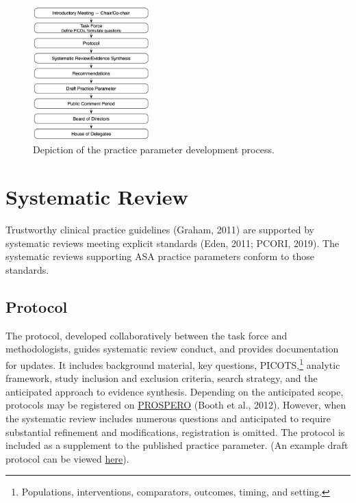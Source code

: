 \documentclass[
  letterpaper,
  DIV=11,
  numbers=noendperiod]{scrreprt}
\begin{document}
\begin{figure}

\caption{\label{fig-process}Depiction of the practice parameter
development process.}

{\centering \includegraphics[width=0.4\textwidth,height=\textheight]{assets/process.png}

}

\end{figure}


\hypertarget{systematic-review}{%
\chapter{Systematic Review}\label{systematic-review}}

Trustworthy clinical practice guidelines (Graham, 2011) are supported by
systematic reviews meeting explicit standards (Eden, 2011; PCORI, 2019).
The systematic reviews supporting ASA practice parameters conform to
those standards.

\hypertarget{protocol}{%
\section{Protocol}\label{protocol}}

The protocol, developed collaboratively between the task force and
methodologists, guides systematic review conduct, and provides
documentation for updates. It includes background material, key
questions, PICOTS,\footnote{Populations, interventions, comparators,
  outcomes, timing, and setting.} analytic framework, study inclusion
and exclusion criteria, search strategy, and the anticipated approach to
evidence synthesis. Depending on the anticipated scope, protocols may be
registered on \href{https://www.crd.york.ac.uk/PROSPERO/}{PROSPERO}
(Booth et al., 2012). However, when the systematic review includes
numerous questions and anticipated to require substantial refinement and
modifications, registration is omitted. The protocol is included as a
supplement to the published practice parameter. (An example draft
protocol can be viewed
\href{assets/Protocol_Geriatrics_2022-09-17.pdf}{here}).
\end{document}
